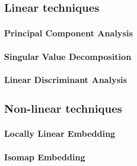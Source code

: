 \subsection{Linear techniques}

\subsubsection{Principal Component Analysis}
\subsubsection{Singular Value Decomposition}
\subsubsection{Linear Discriminant Analysis}

\subsection{Non-linear techniques}

\subsubsection{Locally Linear Embedding}
\subsubsection{Isomap Embedding}
